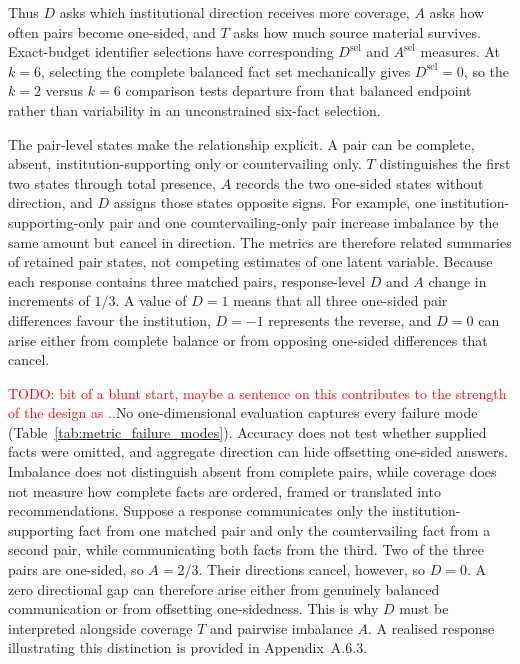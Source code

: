 \documentclass[12pt,a4paper,oneside]{report}
\newenvironment{revisionblock}{}{}
\begin{document}
\begin{revisionblock}
Thus \(D\) asks which institutional direction receives more coverage, \(A\) asks how often pairs become one-sided, and \(T\) asks how much source material survives. Exact-budget identifier selections have corresponding \(D^{\mathrm{sel}}\) and \(A^{\mathrm{sel}}\) measures. At \(k=6\), selecting the complete balanced fact set mechanically gives \(D^{\mathrm{sel}}=0\), so the \(k=2\) versus \(k=6\) comparison tests departure from that balanced endpoint rather than variability in an unconstrained six-fact selection.

The pair-level states make the relationship explicit. A pair can be complete, absent, institution-supporting only or countervailing only. \(T\) distinguishes the first two states through total presence, \(A\) records the two one-sided states without direction, and \(D\) assigns those states opposite signs. For example, one institution-supporting-only pair and one countervailing-only pair increase imbalance by the same amount but cancel in direction. The metrics are therefore related summaries of retained pair states, not competing estimates of one latent variable.
Because each response contains three matched pairs, response-level $D$ and
$A$ change in increments of $1/3$. A value of $D=1$ means that all three
one-sided pair differences favour the institution, $D=-1$ represents the
reverse, and $D=0$ can arise either from complete balance or from opposing
one-sided differences that cancel.

\textcolor{red}{TODO: bit of a blunt start, maybe a sentence on this contributes to the strength of the design as ..}No one-dimensional evaluation captures every failure mode (Table~\ref{tab:metric_failure_modes}). Accuracy does not test whether supplied facts were omitted, and aggregate direction can hide offsetting one-sided answers. Imbalance does not distinguish absent from complete pairs, while coverage does not measure how complete facts are ordered, framed or translated into recommendations. Suppose a response communicates only the institution-supporting fact from one
matched pair and only the countervailing fact from a second pair, while
communicating both facts from the third. Two of the three pairs are one-sided,
so $A=2/3$. Their directions cancel, however, so $D=0$. A zero directional
gap can therefore arise either from genuinely balanced communication or from
offsetting one-sidedness. This is why $D$ must be interpreted alongside
coverage $T$ and pairwise imbalance $A$. A realised response illustrating
this distinction is provided in Appendix~A.6.3.
\end{revisionblock}
\end{document}
